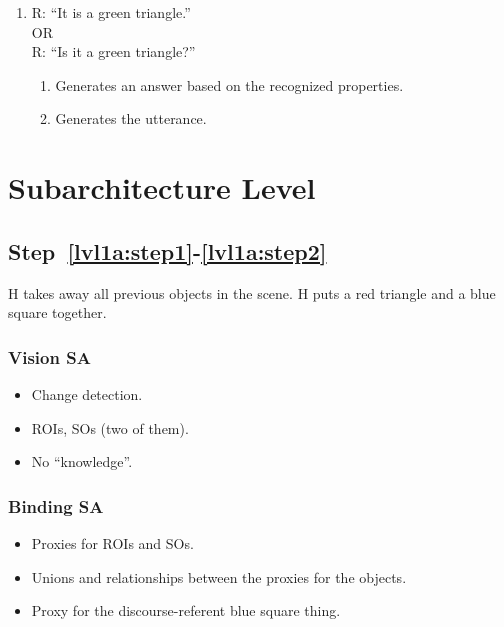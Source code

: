 \documentclass{article}
\begin{document}
\begin{enumerate}
\item \label{lvl2:step14}
  R: ``It is a green triangle.'' \\
  OR\\
  R: ``Is it a green triangle?''
  \begin{enumerate}
  \item \label{lvl2:step14:detail1} Generates an answer based on the
    recognized properties.
  \item \label{lvl2:step14:detail2} Generates the utterance.
  \end{enumerate}
\end{enumerate}




\section{Subarchitecture Level}

\subsection{Step~\ref{lvl1a:step1}-\ref{lvl1a:step2}}
H takes away all previous objects in the scene.  H puts a red triangle
and a blue square together.

\subsubsection{Vision SA}
\begin{itemize}
\item Change detection.
\item ROIs, SOs (two of them).
\item No ``knowledge''.
\end{itemize}

\subsubsection{Binding SA}
\begin{itemize}
\item Proxies for ROIs and SOs.
\item Unions and relationships between the proxies for the objects.
\item Proxy for the discourse-referent blue square thing.
\end{itemize}
\end{document}
